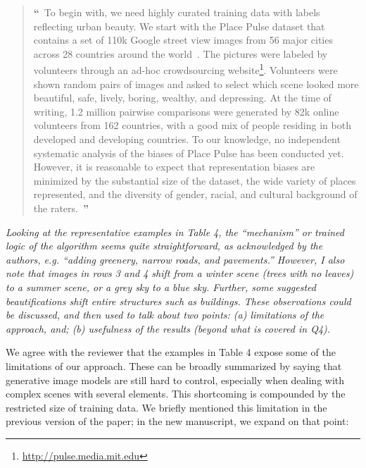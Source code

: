 \documentclass{paper}
\newenvironment{myquote}
{\definecolor{shadecolor}{rgb}{0.9,0.95,1} \begin{shaded*} \sf \em}
{\em\end{shaded*}}
\newenvironment{myquoteOrange}
{\definecolor{shadecolor}{rgb}{1,0.9,0.83} \begin{shaded*} \sf \em}
{\em\end{shaded*}}
\begin{document}
\begin{quote}
{\bf \Large ``}~To begin with, we need highly curated training data with labels reflecting urban beauty. We start with the Place Pulse dataset that contains a set of 110k Google street view images from 56 major cities across 28 countries around the world~\cite{dubey2016deep}. The pictures were labeled by volunteers through an ad-hoc crowdsourcing website\footnote{\url{http://pulse.media.mit.edu}}. Volunteers were shown random pairs of images and asked to select which scene looked more beautiful, safe, lively, boring, wealthy, and depressing. At the time of writing, 1.2 million pairwise comparisons were generated by 82k online volunteers from 162 countries, with a good mix of people residing in both developed and developing countries. To our knowledge, no independent systematic analysis of the biases of Place Pulse has been conducted yet. However, it is reasonable to expect that representation biases are minimized by the substantial size of the dataset, the wide variety of places represented, and the diversity of gender, racial, and cultural background of the raters.~{\bf \Large ''}
\end{quote}


\begin{myquote}
    Looking at the representative examples in Table 4, the ``mechanism'' or trained logic of the algorithm seems quite straightforward, as acknowledged by the authors, e.g. ``adding greenery, narrow roads, and pavements.'' However, I also note that images in rows 3 and 4 shift from a winter scene (trees with no leaves) to a summer scene, or a grey sky to a blue sky. Further, some suggested beautifications shift entire structures such as buildings. These observations could be discussed, and then used to talk about two points: (a) limitations of the approach, and; (b) usefulness of the results (beyond what is covered in Q4).
\end{myquote}

We agree with the reviewer that the examples in Table 4 expose some of the limitations of our approach. These can be broadly summarized by saying that generative image models are still hard to control, especially when dealing with complex scenes with several elements. This shortcoming is compounded by the restricted size of training data. We briefly mentioned this limitation in the previous version of the paper; in the new manuscript, we expand on that point:
\end{document}
